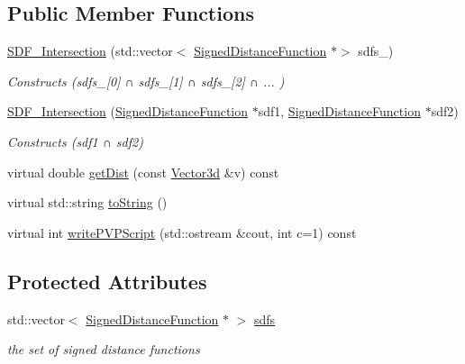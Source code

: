\subsection*{Public Member Functions}
\begin{DoxyCompactItemize}
\item 
\mbox{\label{classCPlantBox_1_1SDF__Intersection_a480face61053d48d92c5bd0e386e6f2d}} 
\hyperlink{classCPlantBox_1_1SDF__Intersection_a480face61053d48d92c5bd0e386e6f2d}{S\+D\+F\+\_\+\+Intersection} (std\+::vector$<$ \hyperlink{classCPlantBox_1_1SignedDistanceFunction}{Signed\+Distance\+Function} $\ast$$>$ sdfs\+\_\+)
\begin{DoxyCompactList}\small\item\em Constructs (sdfs\+\_\+\mbox{[}0\mbox{]} ∩ sdfs\+\_\+\mbox{[}1\mbox{]} ∩ sdfs\+\_\+\mbox{[}2\mbox{]} ∩ ... ) \end{DoxyCompactList}\item 
\mbox{\label{classCPlantBox_1_1SDF__Intersection_ae5e9c64183392fd2cf697e22c1314e19}} 
\hyperlink{classCPlantBox_1_1SDF__Intersection_ae5e9c64183392fd2cf697e22c1314e19}{S\+D\+F\+\_\+\+Intersection} (\hyperlink{classCPlantBox_1_1SignedDistanceFunction}{Signed\+Distance\+Function} $\ast$sdf1, \hyperlink{classCPlantBox_1_1SignedDistanceFunction}{Signed\+Distance\+Function} $\ast$sdf2)
\begin{DoxyCompactList}\small\item\em Constructs (sdf1 ∩ sdf2) \end{DoxyCompactList}\item 
virtual double \hyperlink{classCPlantBox_1_1SDF__Intersection_a2ed780db3881844484086de3f73543e5}{get\+Dist} (const \hyperlink{classCPlantBox_1_1Vector3d}{Vector3d} \&v) const
\item 
virtual std\+::string \hyperlink{classCPlantBox_1_1SDF__Intersection_ae095150852cdaedec026b4dea1f87c40}{to\+String} ()
\item 
virtual int \hyperlink{classCPlantBox_1_1SDF__Intersection_ad7d4972e0a71113d93c357eddac9ae99}{write\+P\+V\+P\+Script} (std\+::ostream \&cout, int c=1) const
\end{DoxyCompactItemize}
\subsection*{Protected Attributes}
\begin{DoxyCompactItemize}
\item 
\mbox{\label{classCPlantBox_1_1SDF__Intersection_ae535a96e22ba7542409a716caf6b3ffc}} 
std\+::vector$<$ \hyperlink{classCPlantBox_1_1SignedDistanceFunction}{Signed\+Distance\+Function} $\ast$ $>$ \hyperlink{classCPlantBox_1_1SDF__Intersection_ae535a96e22ba7542409a716caf6b3ffc}{sdfs}
\begin{DoxyCompactList}\small\item\em the set of signed distance functions \end{DoxyCompactList}\end{DoxyCompactItemize}


